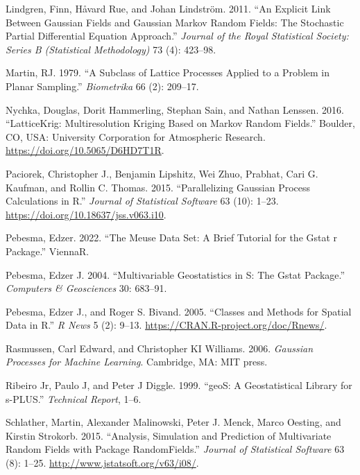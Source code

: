 \begin{CSLReferences}{1}{0}
\leavevmode{}%
Lindgren, Finn, Håvard Rue, and Johan Lindström. 2011. {``An Explicit Link Between Gaussian Fields and Gaussian Markov Random Fields: The Stochastic Partial Differential Equation Approach.''} \emph{Journal of the Royal Statistical Society: Series B (Statistical Methodology)} 73 (4): 423--98.

\leavevmode{}%
Martin, RJ. 1979. {``A Subclass of Lattice Processes Applied to a Problem in Planar Sampling.''} \emph{Biometrika} 66 (2): 209--17.

\leavevmode{}%
Nychka, Douglas, Dorit Hammerling, Stephan Sain, and Nathan Lenssen. 2016. {``LatticeKrig: Multiresolution Kriging Based on Markov Random Fields.''} Boulder, CO, USA: University Corporation for Atmospheric Research. \url{https://doi.org/10.5065/D6HD7T1R}.

\leavevmode{}%
Paciorek, Christopher J., Benjamin Lipshitz, Wei Zhuo, Prabhat, Cari G. Kaufman, and Rollin C. Thomas. 2015. {``Parallelizing Gaussian Process Calculations in {R}.''} \emph{Journal of Statistical Software} 63 (10): 1--23. \url{https://doi.org/10.18637/jss.v063.i10}.

\leavevmode{}%
Pebesma, Edzer. 2022. {``The Meuse Data Set: A Brief Tutorial for the Gstat r Package.''} ViennaR.

\leavevmode{}%
Pebesma, Edzer J. 2004. {``Multivariable Geostatistics in {S}: The Gstat Package.''} \emph{Computers \& Geosciences} 30: 683--91.

\leavevmode{}%
Pebesma, Edzer J., and Roger S. Bivand. 2005. {``Classes and Methods for Spatial Data in {R}.''} \emph{R News} 5 (2): 9--13. \url{https://CRAN.R-project.org/doc/Rnews/}.

\leavevmode{}%
Rasmussen, Carl Edward, and Christopher KI Williams. 2006. \emph{Gaussian Processes for Machine Learning}. Cambridge, MA: MIT press.

\leavevmode{}%
Ribeiro Jr, Paulo J, and Peter J Diggle. 1999. {``geoS: A Geostatistical Library for s-PLUS.''} \emph{Technical Report}, 1--6.

\leavevmode{}%
Schlather, Martin, Alexander Malinowski, Peter J. Menck, Marco Oesting, and Kirstin Strokorb. 2015. {``Analysis, Simulation and Prediction of Multivariate Random Fields with Package {RandomFields}.''} \emph{Journal of Statistical Software} 63 (8): 1--25. \url{http://www.jstatsoft.org/v63/i08/}.


\end{CSLReferences}
